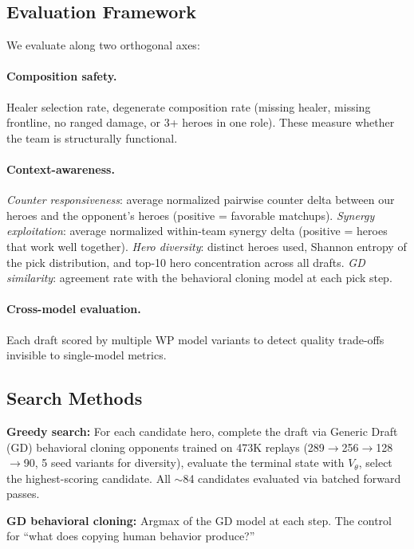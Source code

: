 \documentclass[journal]{IEEEtran}
\begin{document}
\subsection{Evaluation Framework}

We evaluate along two orthogonal axes:

\paragraph{Composition safety.} Healer selection rate, degenerate composition rate (missing healer, missing frontline, no ranged damage, or 3+ heroes in one role). These measure whether the team is structurally functional.

\paragraph{Context-awareness.} \textit{Counter responsiveness}: average normalized pairwise counter delta between our heroes and the opponent's heroes (positive = favorable matchups). \textit{Synergy exploitation}: average normalized within-team synergy delta (positive = heroes that work well together). \textit{Hero diversity}: distinct heroes used, Shannon entropy of the pick distribution, and top-10 hero concentration across all drafts. \textit{GD similarity}: agreement rate with the behavioral cloning model at each pick step.

\paragraph{Cross-model evaluation.} Each draft scored by multiple WP model variants to detect quality trade-offs invisible to single-model metrics.

\subsection{Search Methods}

\textbf{Greedy search:} For each candidate hero, complete the draft via Generic Draft (GD) behavioral cloning opponents trained on 473K replays (289$\to$256$\to$128$\to$90, 5 seed variants for diversity), evaluate the terminal state with $V_\theta$, select the highest-scoring candidate. All $\sim$84 candidates evaluated via batched forward passes.

\textbf{GD behavioral cloning:} Argmax of the GD model at each step. The control for ``what does copying human behavior produce?''
\end{document}
